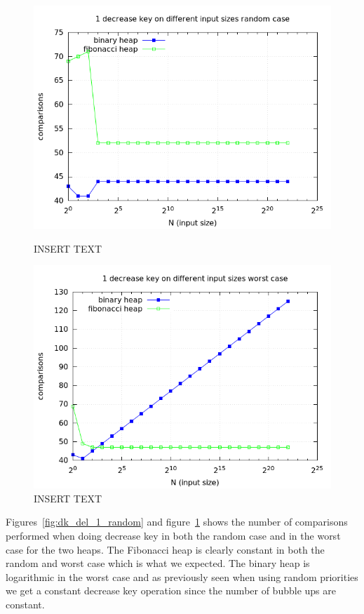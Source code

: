 \documentclass[a4paper,oneside,article,11pt]{memoir}
\begin{document}
\begin{figure}[H]
\centering
\begin{minipage}{0.48\columnwidth}
  \centering
  \includegraphics[width=\linewidth]{../res/dk/dk_random_fixed_size_1.png}%
  \caption{INSERT TEXT}
  \label{fig:dk_del_1_random}
\end{minipage}%
\hfill
\begin{minipage}{0.48\columnwidth}
  \centering
  \includegraphics[width=\linewidth]{../res/dk/dk_worst_fixed_size_1.png}%
  \caption{INSERT TEXT}
  \label{fig:dk_del_1_worst}
\end{minipage}
\end{figure}

Figures~\ref{fig:dk_del_1_random} and figure~\ref{fig:dk_del_1_worst} shows the number of comparisons performed when doing decrease key in both the random case and in the worst case for the two heaps. The Fibonacci heap is clearly constant in both the random and worst case which is what we expected. The binary heap is logarithmic in the worst case and as previously seen when using random priorities we get a constant decrease key operation since the number of bubble ups are constant.
\end{document}
